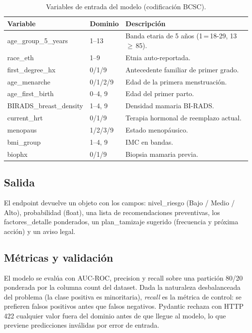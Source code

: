 \documentclass[conference,a4paper,10pt]{IEEEtran}
\newcommand{\code}[1]{{\ttfamily\small\textcolor{hai-primary-dark}{#1}}}
\begin{document}
\begin{table}[!t]
\caption{Variables de entrada del modelo (codificación BCSC).}
\label{tab:vars}
\centering
\renewcommand{\arraystretch}{1.1}
\begin{tabularx}{\columnwidth}{@{}l l X@{}}
\toprule
\rowcolor{hai-primary-soft}
\textbf{\color{hai-primary-dark}Variable} &
\textbf{\color{hai-primary-dark}Dominio} &
\textbf{\color{hai-primary-dark}Descripción} \\
\midrule
\code{age\_group\_5\_years}     & 1--13      & Banda etaria de 5 años (1\,=\,18-29, 13\,$\geq$\,85). \\
\code{race\_eth}                & 1--9       & Etnia auto-reportada. \\
\code{first\_degree\_hx}        & 0/1/9      & Antecedente familiar de primer grado. \\
\code{age\_menarche}            & 0/1/2/9    & Edad de la primera menstruación. \\
\code{age\_first\_birth}        & 0--4, 9    & Edad del primer parto. \\
\code{BIRADS\_breast\_density}  & 1--4, 9    & Densidad mamaria BI-RADS. \\
\code{current\_hrt}             & 0/1/9      & Terapia hormonal de reemplazo actual. \\
\code{menopaus}                 & 1/2/3/9    & Estado menopáusico. \\
\code{bmi\_group}               & 1--4, 9    & IMC en bandas. \\
\code{biophx}                   & 0/1/9      & Biopsia mamaria previa. \\
\bottomrule
\end{tabularx}
\end{table}

\subsection{Salida}
El endpoint devuelve un objeto con los campos: \code{nivel\_riesgo}
(Bajo / Medio / Alto), \code{probabilidad} (float), una lista de
\code{recomendaciones} preventivas, los \code{factores\_detalle}
ponderados, un \code{plan\_tamizaje} sugerido (frecuencia y próxima
acción) y un \code{aviso} legal.

\subsection{Métricas y validación}
El modelo se evalúa con AUC-ROC, precision y recall sobre una partición
80/20 ponderada por la columna \code{count} del dataset. Dada la
naturaleza desbalanceada del problema (la clase positiva es
minoritaria), \emph{recall} es la métrica de control: se prefieren
falsos positivos antes que falsos negativos. Pydantic rechaza con HTTP
422 cualquier valor fuera del dominio antes de que llegue al modelo, lo
que previene predicciones inválidas por error de entrada.
\end{document}
